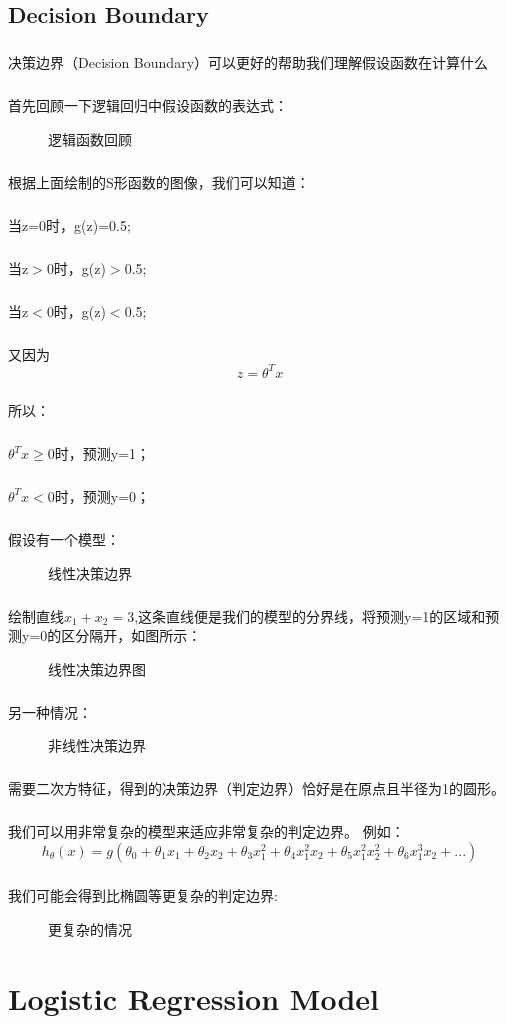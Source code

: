 \documentclass{article}
\begin{document}
\begin{CJK}{UTF8}{gbsn}
\subsection{Decision Boundary}
\subparagraph{}
决策边界（Decision Boundary）可以更好的帮助我们理解假设函数在计算什么
\subparagraph{}
首先回顾一下逻辑回归中假设函数的表达式：
\begin{figure}[H]
\caption{逻辑函数回顾}
\label{fig:309}
\end{figure}
\subparagraph{}
根据上面绘制的S形函数的图像，我们可以知道：
\subparagraph{}
当z=0时，g(z)=0.5;
\subparagraph{}
当z$>$0时，g(z)$>$0.5;
\subparagraph{}
当z$<$0时，g(z)$<$0.5;
\subparagraph{}
又因为
\begin{equation}
z=\theta^Tx
\end{equation}
\subparagraph{}
所以：
\subparagraph{}
$\theta^Tx\geq0$时，预测y=1；
\subparagraph{}
$\theta^Tx<0$时，预测y=0；
\subparagraph{}
假设有一个模型：
\begin{figure}[H]
\caption{线性决策边界}
\label{fig:310}
\end{figure}
\subparagraph{}
绘制直线$x_1+x_2=3$,这条直线便是我们的模型的分界线，将预测y=1的区域和预测y=0的区分隔开，如图所示：
\begin{figure}[H]
\caption{线性决策边界图}
\label{fig:320}
\end{figure}
\subparagraph{}
另一种情况：
\begin{figure}[H]
\caption{非线性决策边界}
\label{fig:312}
\end{figure}
\subparagraph{}
需要二次方特征，得到的决策边界（判定边界）恰好是在原点且半径为1的圆形。
\subparagraph{}
我们可以用非常复杂的模型来适应非常复杂的判定边界。
例如：
\begin{equation}
h_\theta(x)=g(\theta_0+\theta_1x_1+\theta_2x_2+\theta_3x_1^2+\theta_4x_1^2x_2+\theta_5x_1^2x_2^2+\theta_6x_1^3x_2+...)
\end{equation}
\subparagraph{}
我们可能会得到比椭圆等更复杂的判定边界:
\begin{figure}[H]
\caption{更复杂的情况}
\label{fig:313}
\end{figure}
\section{Logistic Regression Model}

\end{CJK}
\end{document}
